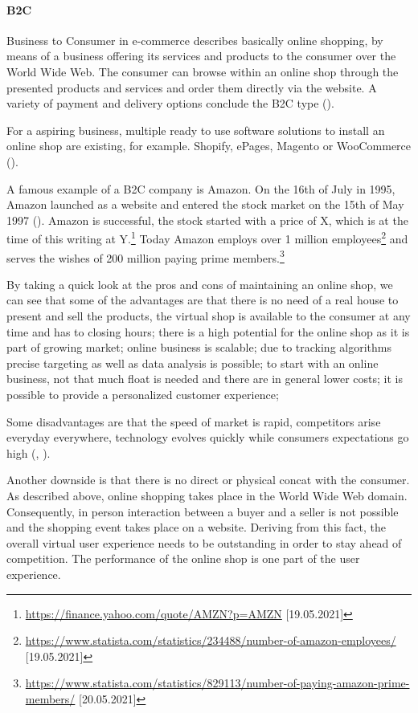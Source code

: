 \paragraph{B2C}
Business to Consumer in e-commerce describes basically online shopping, by means of a business offering its services and products to the consumer over the World Wide Web.
The consumer can browse within an online shop through the presented products and services and order them directly via the website.
A variety of payment and delivery options conclude the B2C type (\cite{2020Heinemann}).

For a aspiring business, multiple ready to use software solutions to install an online shop are existing, for example. Shopify, ePages, Magento or WooCommerce (\cite{2019Steireif}).

A famous example of a B2C company is Amazon.
On the 16th of July in 1995, Amazon launched as a website and entered the stock market on the 15th of May 1997 (\cite{2019Stone}). %
Amazon is successful, the stock started with a price of X, which is at the time of this writing at Y.\footnote{\url{https://finance.yahoo.com/quote/AMZN?p=AMZN} [19.05.2021]}
Today Amazon employs over 1 million employees\footnote{\url{https://www.statista.com/statistics/234488/number-of-amazon-employees/} [19.05.2021]} and serves the wishes of 200 million paying prime members.\footnote{\url{https://www.statista.com/statistics/829113/number-of-paying-amazon-prime-members/} [20.05.2021]}


By taking a quick look at the pros and cons of maintaining an online shop, we can see that some of the advantages are that there is no need of a real house to present and sell the products, the virtual shop is available to the consumer at any time and has to closing hours; there is a high potential for the online shop as it is part of growing market; online business is scalable; due to tracking algorithms precise targeting as well as data analysis is possible; to start with an online business, not that much float is needed and there are in general lower costs; it is possible to provide a personalized customer experience; 

Some disadvantages are that the speed of market is rapid, competitors arise everyday everywhere, technology evolves quickly while consumers expectations go high (\cite{2019Hermogeno}, \cite{2020Lang}).


Another downside is that there is no direct or physical concat with the consumer.
As described above, online shopping takes place in the World Wide Web domain.
Consequently, in person interaction between a buyer and a seller is not possible and the shopping event takes place on a website.
Deriving from this fact, the overall virtual user experience needs to be outstanding in order to stay ahead of competition.
The performance of the online shop is one part of the user experience.

